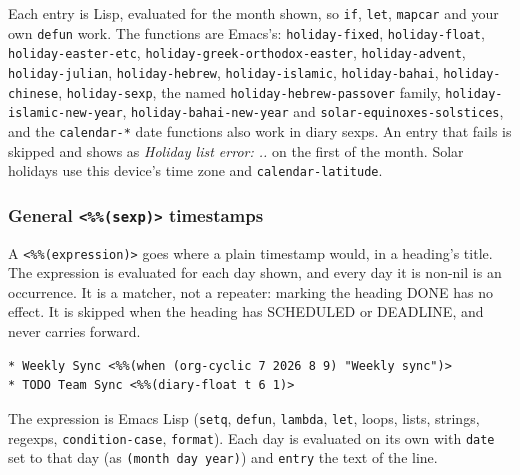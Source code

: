 \documentclass[11pt]{article}
\begin{document}
Each entry is Lisp, evaluated for the month shown, so \texttt{if}, \texttt{let}, \texttt{mapcar} and your own \texttt{defun} work. The functions are Emacs's: \texttt{holiday-fixed}, \texttt{holiday-float}, \texttt{holiday-easter-etc}, \texttt{holiday-greek-orthodox-easter}, \texttt{holiday-advent}, \texttt{holiday-julian}, \texttt{holiday-hebrew}, \texttt{holiday-islamic}, \texttt{holiday-bahai}, \texttt{holiday-chinese}, \texttt{holiday-sexp}, the named \texttt{holiday-hebrew-passover} family, \texttt{holiday-islamic-new-year}, \texttt{holiday-bahai-new-year} and \texttt{solar-equinoxes-solstices}, and the \texttt{calendar-*} date functions also work in diary sexps. An entry that fails is skipped and shows as \emph{Holiday list error: ..} on the first of the month. Solar holidays use this device's time zone and \texttt{calendar-latitude}.

\subsubsection{General \texttt{<\%\%(sexp)>} timestamps}
\label{sec:orgfd4eb7b}
A \texttt{<\%\%(expression)>} goes where a plain timestamp would, in a heading's title. The expression is evaluated for each day shown, and every day it is non-nil is an occurrence. It is a matcher, not a repeater: marking the heading DONE has no effect. It is skipped when the heading has SCHEDULED or DEADLINE, and never carries forward.

\begin{verbatim}
* Weekly Sync <%%(when (org-cyclic 7 2026 8 9) "Weekly sync")>
* TODO Team Sync <%%(diary-float t 6 1)>
\end{verbatim}

The expression is Emacs Lisp (\texttt{setq}, \texttt{defun}, \texttt{lambda}, \texttt{let}, loops, lists, strings, regexps, \texttt{condition-case}, \texttt{format}). Each day is evaluated on its own with \texttt{date} set to that day (as \texttt{(month day year)}) and \texttt{entry} the text of the line.
\end{document}
